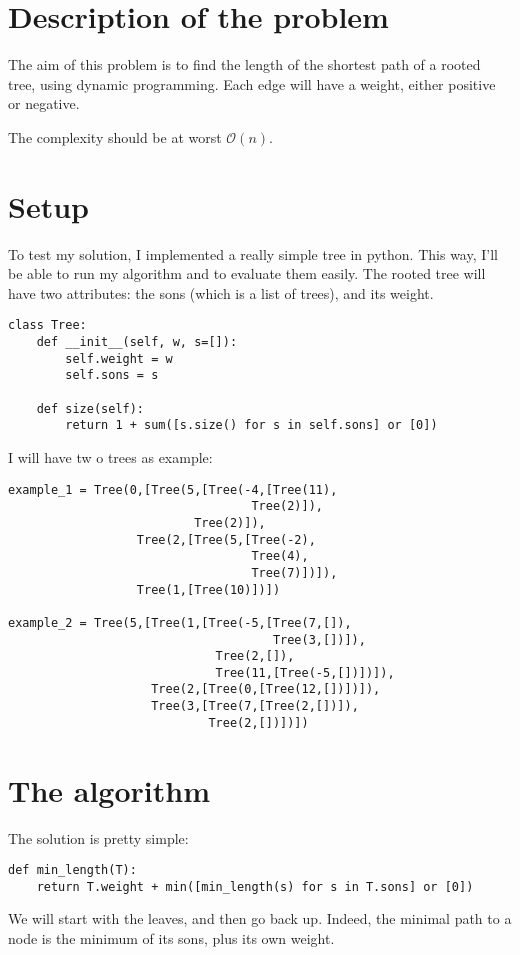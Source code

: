 \section{Description of the problem}
	The aim of this problem is to find the length of the shortest path of a rooted tree, using dynamic programming. Each edge will have a weight, either positive or negative.

	The complexity should be at worst $\mathcal{O}(n)$.

\section{Setup}
	To test my solution, I implemented a really simple tree in python. This way, I'll be able to run my algorithm and to evaluate them easily.
	The rooted tree will have two attributes: the sons (which is a list of trees), and its weight.
\begin{lstlisting}
class Tree:
    def __init__(self, w, s=[]):
        self.weight = w
        self.sons = s

	def size(self):
        return 1 + sum([s.size() for s in self.sons] or [0])
\end{lstlisting}

	\newpage	
	I will have tw 	o trees as example:
\begin{lstlisting}
example_1 = Tree(0,[Tree(5,[Tree(-4,[Tree(11),
                                  Tree(2)]),
                          Tree(2)]),
                  Tree(2,[Tree(5,[Tree(-2),
                                  Tree(4),
                                  Tree(7)])]),
                  Tree(1,[Tree(10)])])

example_2 = Tree(5,[Tree(1,[Tree(-5,[Tree(7,[]),
                                     Tree(3,[])]),
                             Tree(2,[]),
                             Tree(11,[Tree(-5,[])])]),
                    Tree(2,[Tree(0,[Tree(12,[])])]),
                    Tree(3,[Tree(7,[Tree(2,[])]),
                            Tree(2,[])])])
\end{lstlisting}

\section{The algorithm}
	The solution is pretty simple:
\begin{lstlisting}
def min_length(T):
    return T.weight + min([min_length(s) for s in T.sons] or [0])
\end{lstlisting}
	We will start with the leaves, and then go back up. Indeed, the minimal path to a node is the minimum of its sons, plus its own weight.

